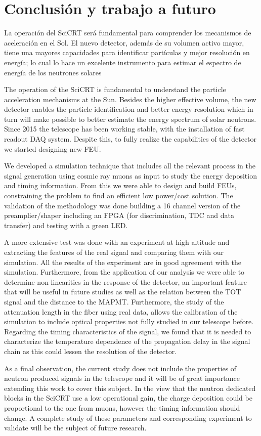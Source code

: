 
\chapter{Conclusión y trabajo a futuro}

La operación del SciCRT será fundamental para comprender los mecanismos de aceleración en el Sol. El nuevo detector, además de su volumen activo mayor, tiene una mayores capacidades para identificar partículas y mejor resolución en energía; lo cual lo hace un excelente instrumento para estimar el espectro de energía de los neutrones solares

The operation of the SciCRT is fundamental to understand the particle acceleration mechanisms at the Sun. Besides the higher effective volume, the new detector enables the particle identification and better energy resolution which in turn will make possible to better estimate the energy spectrum of solar neutrons. Since \num{2015} the telescope has been working stable, with the installation of fast readout DAQ system. Despite this, to fully realize the capabilities of the detector we started designing new FEU.

We developed	a simulation technique that includes all the relevant process in the signal generation using cosmic ray muons as input to study the energy deposition and timing information. From this we were able to design and build FEUs, constraining the problem to find an efficient low power/cost solution. The validation of the methodology was done building a \num{16} channel version of the preamplier/shaper including an FPGA (for discrimination, TDC and data transfer) and testing with a green LED.

A more extensive test was done with an experiment at high altitude and extracting the features of the real signal and comparing them with our simulation. All the results of the experiment are in good agreement with the simulation. Furthermore, from the application of our analysis we were able to determine non-linearities in the response of the detector, an important feature that will be useful in future studies as well as the relation between the TOT signal and the distance to the MAPMT. Furthermore, the study of the attenuation length in the fiber using real data, allows the calibration of the simulation to include optical properties not fully studied in our telescope before. Regarding the timing characteristics of the signal, we found that it is needed to characterize the temperature dependence of the propagation delay in the signal chain as this could lessen the resolution of the detector.

As a final observation, the current study does not include the properties of neutron produced signals in the telescope and it will be of great importance extending this work to cover this subject. In the view that the neutron dedicated blocks in the SciCRT use a low operational gain, the charge deposition could be proportional to the one from muons, however the timing information should change. A complete study of these parameters and corresponding experiment to validate will be the subject of future research.
